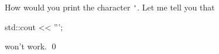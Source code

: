 How would you print the character \verb!'!. Let me tell you that
\begin{console}
std::cout << ''';
\end{console}
won't work.
\qed
